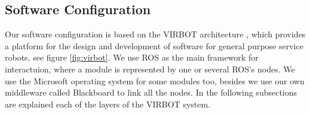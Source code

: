 \documentclass{llncs}
\begin{document}



\subsection{Software Configuration}
Our software configuration is based on the VIRBOT architecture \cite{virbot}, 
which provides a platform for the design and development of software for general purpose service robots, see figure \ref{fig:virbot}. 
We use ROS as the main framework for interactuion, where a module is represented by one or 
several ROS's nodes. We use the Microsoft operating system for some modules too, besides we use our own middleware called Blackboard to link all the nodes.
In the following subsections are explained each of the layers of the VIRBOT system.
\end{document}
